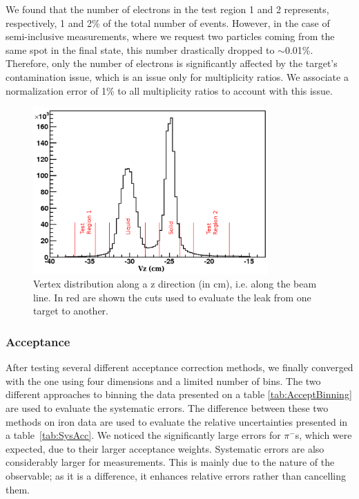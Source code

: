 We found that the number of electrons in the test region 1 and 2 represents, 
respectively, 1 and 2\% of the total number of events. However, in the case 
of semi-inclusive measurements, where we request two particles coming from the
same spot in the final state, this number drastically dropped to $\sim$0.01\%. 
Therefore, only the number of electrons is significantly affected by the 
target's contamination issue, which is an issue only for multiplicity ratios.
We associate a normalization error of 1\% to all multiplicity ratios to account
with this issue.

\begin{figure}[tbp]
\centering
\includegraphics[width=9cm] {chap5-fig/Vertex.png}
\caption {Vertex distribution along a z direction (in cm), i.e. along the 
beam line. In red are shown the cuts used to evaluate the leak from one target to 
another.}
\label{fig:targetleak}
\end{figure}

\subsubsection{Acceptance}

After testing several different acceptance correction methods, we finally 
converged with the one using four dimensions and a limited number of bins.
The two different approaches to binning the data presented on a table 
\ref{tab:AcceptBinning} are used to evaluate the systematic errors. The 
difference between these two methods on iron data are used to evaluate 
the relative uncertainties presented in a table~\ref{tab:SysAcc}. We noticed 
the significantly large errors for $\pi^-$s, which were expected, due to their 
larger acceptance weights. Systematic errors are also
considerably larger for \dpt measurements. This is mainly due to the nature of 
the \dpt observable; as it is a difference, it enhances relative errors 
rather than cancelling them. 

